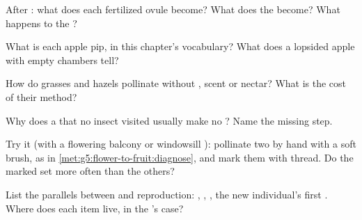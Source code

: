 \begin{exercise}[$\star$]\label{exo:g5:flower-to-fruit:4}
After : what does each fertilized ovule become?
What does the  become? What happens to the ?
\end{exercise}

\begin{exercise}[$\star$]\label{exo:g5:flower-to-fruit:5}
What is each apple pip, in this chapter's vocabulary? What
does a lopsided apple with empty chambers tell?
\end{exercise}

\begin{exercise}[$\star$]\label{exo:g5:flower-to-fruit:6}
How do grasses and hazels pollinate without , scent or
nectar? What is the cost of their method?
\end{exercise}

\begin{exercise}[$\star$]\label{exo:g5:flower-to-fruit:7}
Why does a  that no insect visited usually make no
? Name the missing step.
\end{exercise}

\begin{exercise}[$\star$]\label{exo:g5:flower-to-fruit:8}
Try it (with a flowering balcony or windowsill ):
pollinate two  by hand with a soft brush, as in
\cref{met:g5:flower-to-fruit:diagnose}, and mark them with
thread. Do the marked  set  more often than the
others?
\end{exercise}

\begin{exercise}[$\star\star$]\label{exo:g5:flower-to-fruit:9}
List the parallels between  and  reproduction:
 , , , the new individual's
first . Where does each item live, in the 's
case?
\end{exercise}

